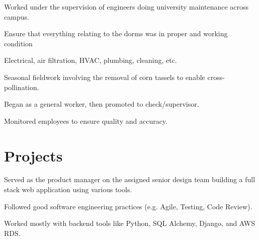 \documentclass[]{latex/resume}
\begin{document}
\begin{minipage}[t]{0.75\textwidth}
    \sectionsep

         
        \begin{tightemize}
            \sectionsep
                \item Worked under the supervision of engineers doing university maintenance across campus.
                \item Ensure that everything relating to the dorms was in proper and working condition
                \item Electrical, air filtration, HVAC, plumbing, cleaning, etc.
            \end{tightemize}
            
    \sectionsep

     
    \begin{tightemize}
        \sectionsep
            \item Seasonal fieldwork involving the removal of corn tassels to enable cross-pollination.
            \item Began as a general worker, then promoted to check/supervisor.
            \item Monitored employees to ensure quality and accuracy.
    \end{tightemize}
    



\section{Projects}

     
    \begin{tightemize}
        \item Served as the product manager on the assigned senior design team building a full stack web application using various tools.
        \item Followed good software engineering practices (e.g. Agile, Testing, Code Review).
        \item Worked mostly with backend tools like Python, SQL Alchemy, Django, and AWS RDS.
    \end{tightemize}


\end{minipage}
\end{document}
